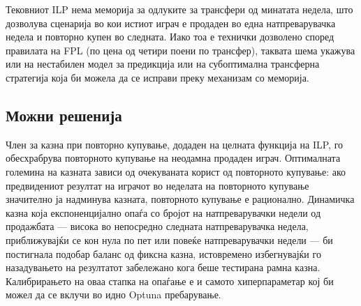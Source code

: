 Тековниот ILP нема меморија за одлуките за трансфери од минатата недела, што дозволува сценарија во кои истиот играч е продаден во една натпреварувачка недела и повторно купен во следната. Иако тоа е технички дозволено според правилата на FPL (по цена од четири поени по трансфер), таквата шема укажува или на нестабилен модел за предикција или на субоптимална трансферна стратегија која би можела да се исправи преку механизам со меморија.

\subsection{Можни решенија}

Член за казна при повторно купување, додаден на целната функција на ILP, го обесхрабрува повторното купување на неодамна продаден играч. Оптималната големина на казната зависи од очекуваната корист од повторното купување: ако предвидениот резултат на играчот во неделата на повторното купување значително ја надминува казната, повторното купување е рационално. Динамичка казна која експоненцијално опаѓа со бројот на натпреварувачки недели од продажбата — висока во непосредно следната натпреварувачка недела, приближувајќи се кон нула по пет или повеќе натпреварувачки недели — би постигнала подобар баланс од фиксна казна, истовремено избегнувајќи го назадувањето на резултатот забележано кога беше тестирана рамна казна. Калибрирањето на оваа стапка на опаѓање е и самото хиперпараметар кој би можел да се вклучи во идно Optuna пребарување.
